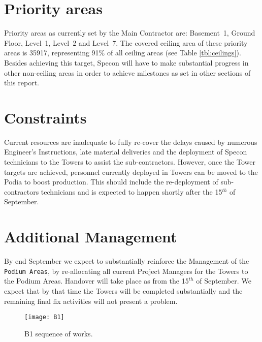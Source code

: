 \section{Priority areas}
Priority areas as currently set by the Main Contractor are: Basement~1, Ground Floor, Level~1, Level~2 and Level~7. The covered ceiling area of these priority areas is 35917\sm, representing  91\% of all ceiling areas (see Table \ref{tbl:ceilings}). Besides achieving this target,  Specon will have to make substantial progress in other non-ceiling areas in order to achieve milestones as set in other sections of this report. 




\section{Constraints}
\label{sec:podium}
Current resources are inadequate to fully re-cover the delays caused by numerous Engineer's Instructions, late material deliveries and the deployment of Specon technicians to the Towers to assist the sub-contractors. However, once the Tower targets are achieved, personnel currently deployed in Towers can be moved to the Podia to boost production. This should include the re-deployment of sub-contractors technicians and is expected to happen shortly after the 15$^{th}$ of September.

\section{Additional Management}

By end September we expect to substantially reinforce the Management of the \texttt{Podium Areas}, by re-allocating all current Project Managers for the Towers to the Podium Areas. Handover will take place as from the 15$^{th}$ of September. We expect that by that time the Towers will be completed substantially and the remaining final fix activities will not present a problem.








\begin{figure*}[htbp]
 \texttt{[image: B1]}
  \caption{B1 sequence of works.}
  \label{fig:B1sequence}
\end{figure*}


